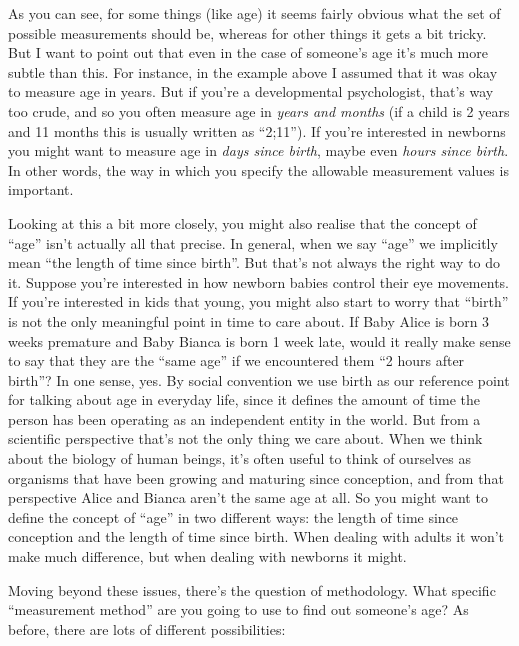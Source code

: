 \documentclass[
]{book}
\begin{document}
As you can see, for some things (like age) it seems fairly obvious what the set of possible measurements should be, whereas for other things it gets a bit tricky. But I want to point out that even in the case of someone's age it's much more subtle than this. For instance, in the example above I assumed that it was okay to measure age in years. But if you're a developmental psychologist, that's way too crude, and so you often measure age in \emph{years and months} (if a child is 2 years and 11 months this is usually written as ``2;11''). If you're interested in newborns you might want to measure age in \emph{days since birth}, maybe even \emph{hours since birth}. In other words, the way in which you specify the allowable measurement values is important.

Looking at this a bit more closely, you might also realise that the concept of ``age'' isn't actually all that precise. In general, when we say ``age'' we implicitly mean ``the length of time since birth''. But that's not always the right way to do it. Suppose you're interested in how newborn babies control their eye movements. If you're interested in kids that young, you might also start to worry that ``birth'' is not the only meaningful point in time to care about. If Baby Alice is born 3 weeks premature and Baby Bianca is born 1 week late, would it really make sense to say that they are the ``same age'' if we encountered them ``2 hours after birth''? In one sense, yes. By social convention we use birth as our reference point for talking about age in everyday life, since it defines the amount of time the person has been operating as an independent entity in the world. But from a scientific perspective that's not the only thing we care about. When we think about the biology of human beings, it's often useful to think of ourselves as organisms that have been growing and maturing since conception, and from that perspective Alice and Bianca aren't the same age at all. So you might want to define the concept of ``age'' in two different ways: the length of time since conception and the length of time since birth. When dealing with adults it won't make much difference, but when dealing with newborns it might.

Moving beyond these issues, there's the question of methodology. What specific ``measurement method'' are you going to use to find out someone's age? As before, there are lots of different possibilities:
\end{document}
